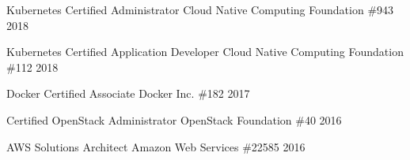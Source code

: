

\begin{cvhonors}

\cvhonor
    {Kubernetes Certified Administrator}
    {Cloud Native Computing Foundation}
    {\#943}
    {2018} %

  \cvhonor
    {Kubernetes Certified Application Developer}
    {Cloud Native Computing Foundation}
    {\#112}
    {2018} %

  \cvhonor
    {Docker Certified Associate}
    {Docker Inc.}
    {\#182}
    {2017} %

  \cvhonor
    {Certified OpenStack Administrator}
    {OpenStack Foundation}
    {\#40}
    {2016} %

  \cvhonor
    {AWS Solutions Architect}
    {Amazon Web Services}
    {\#22585}
    {2016} %


\end{cvhonors}
